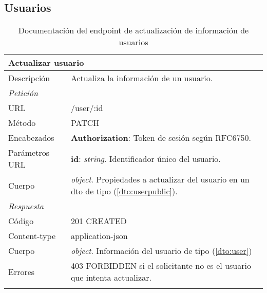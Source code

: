 \subsection{Usuarios}

\begin{longtable}{|p{} p{}|}
    \hline
    \multicolumn{2}{|l|}{\textbf{Actualizar usuario}} \\ \hline 
    Descripción         & Actualiza la información de un usuario. \\ \hline \hline
    \multicolumn{2}{|l|}{\emph{Petición}}  \\ \hline 
    URL      & /user/:id \\ \hline
    Método   & PATCH                  \\ \hline
    Encabezados  & 
    \textbf{Authorization}: Token de sesión según RFC6750. \\ \hline
    Parámetros URL  & 
    \textbf{id}: \emph{string}. Identificador único del usuario. \\ \hline
    Cuerpo &
    \emph{object}. Propiedades a actualizar del usuario en un \acrshort{dto} de tipo \nameref{dto:userpublic} (\ref{dto:userpublic}). \\ \hline \hline
    \multicolumn{2}{|l|}{\emph{Respuesta}} \\ \hline 
    Código          & 201 CREATED         \\ \hline
    Content-type    & application-json  \\ \hline
    Cuerpo  & 
    \emph{object}. Información del usuario de tipo \nameref{dto:user} (\ref{dto:user}) \\ \hline \hline
    Errores & 403 FORBIDDEN si el solicitante no es el usuario que intenta actualizar.
    \\ \hline
    \caption{Documentación del endpoint de actualización de información de usuarios}
    \label{api:actualizar_usuario}
\end{longtable}

